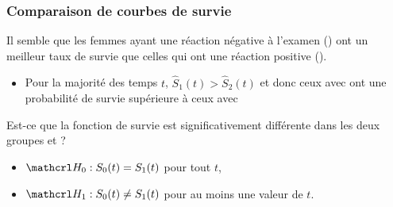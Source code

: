 \documentclass{beamer}
\begin{document}
\begin{frame}
\frametitle{Comparaison de courbes de survie}
Il semble que les femmes ayant une réaction négative à l'examen () ont un \alert{meilleur} taux de survie que celles qui ont une réaction positive ().
\begin{itemize}
\item Pour la majorité des temps $t$, $\widehat{S}_1(t) > \widehat{S}_2(t)$ et donc ceux avec  ont une probabilité de survie supérieure à ceux avec 
\end{itemize}
Est-ce que la fonction de survie est significativement différente dans les deux groupes  et ?
\begin{itemize}
\vp \vp
\item[] $\Hy_0: S_0(t) = S_1(t)$ pour tout $t$,
\item[] $\Hy_1: S_0(t) \neq S_1(t)$ pour au moins une valeur de $t$.
\end{itemize}
\end{frame}
\end{document}
